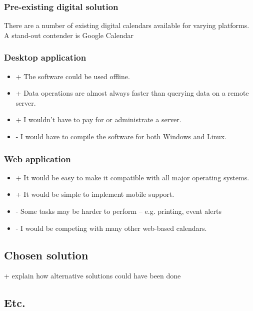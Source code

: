 \subsubsection{Pre-existing digital solution}

There are a number of existing digital calendars available for varying
platforms. A stand-out contender is Google Calendar


\subsubsection{Desktop application}

\begin{itemize}
  \item + The software could be used offline.
  \item + Data operations are almost always faster than querying data on a
          remote server.
  \item + I wouldn't have to pay for or administrate a server.
  \item - I would have to compile the software for both Windows and Linux.
\end{itemize}


\subsubsection{Web application}

\begin{itemize}
  \item + It would be easy to make it compatible with all major operating
          systems.
  \item + It would be simple to implement mobile support.
  \item - Some tasks may be harder to perform -- e.g. printing, event alerts
  \item - I would be competing with many other web-based calendars.
\end{itemize}


\subsection{Chosen solution}

+ explain how alternative solutions could have been done

\subsection{Etc.}
